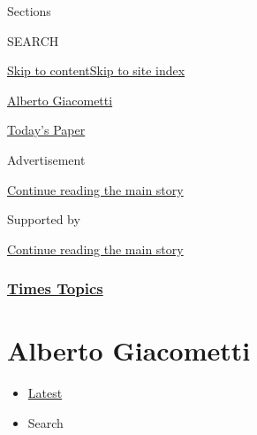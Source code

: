 Sections

SEARCH

\protect\hyperlink{site-content}{Skip to
content}\protect\hyperlink{site-index}{Skip to site index}

\href{https://www.nytimes3xbfgragh.onion/topic/person/alberto-giacometti}{Alberto
Giacometti}

\href{https://myaccount.nytimes3xbfgragh.onion/auth/login?response_type=cookie\&client_id=vi}{}

\href{https://www.nytimes3xbfgragh.onion/section/todayspaper}{Today's
Paper}

Advertisement

\protect\hyperlink{after-top}{Continue reading the main story}

Supported by

\protect\hyperlink{after-sponsor}{Continue reading the main story}

\hypertarget{times-topics}{%
\subsubsection{\texorpdfstring{\href{/index.html}{Times
Topics}}{Times Topics}}\label{times-topics}}

\hypertarget{alberto-giacometti}{%
\section{Alberto Giacometti}\label{alberto-giacometti}}

\begin{itemize}
\tightlist
\item
  \protect\hyperlink{stream-panel}{Latest}
\item
  Search
\end{itemize}


